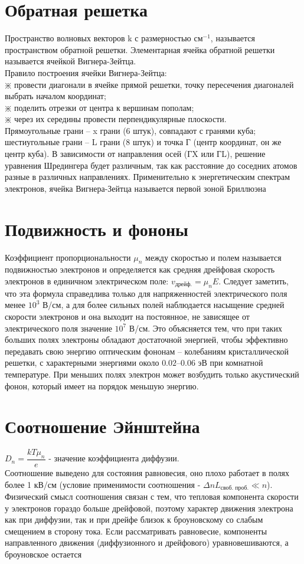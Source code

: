 \begin{multicols*}{2}
		\section{Обратная решетка}
		Пространство волновых векторов k с размерностью $\text{см}^{-1}$, называется пространством обратной решетки. Элементарная ячейка обратной решетки называется ячейкой Вигнера-Зейтца.\\
		Правило построения ячейки Вигнера-Зейтца:\\
		$\divideontimes$ провести диагонали в ячейке прямой решетки, точку пересечения диагоналей выбрать началом координат;\\
		$\divideontimes$ поделить отрезки от центра к вершинам пополам;\\
		$\divideontimes$ через их середины провести перпендикулярные плоскости.\\
		Прямоугольные грани – x грани (6 штук), совпадают с гранями куба; шестиугольные грани – L грани (8 штук) и точка Г (центр координат, он же центр куба). В зависимости от направления осей (ГX или ГL), решение уравнения Шредингера будет различным, так как расстояние до соседних атомов разные в различных направлениях. Применительно к энергетическим спектрам электронов, ячейка Вигнера-Зейтца называется первой зоной Бриллюэна

		\section{Подвижность и фононы}
		Коэффициент пропорциональности $\mu_n$ между скоростью и полем называется подвижностью электронов и определяется как средняя дрейфовая скорость электронов в единичном электрическом поле: $v_\text{дрейф.} = \mu_n E$. Следует заметить, что эта формула справедлива только для напряженностей электрического поля менее $10^3$ В/см, а для более сильных полей наблюдается насыщение средней скорости электронов и она выходит на постоянное, не зависящее от электрического поля значение $10^7$ В/см. Это объясняется тем, что при таких больших полях электроны обладают достаточной энергией, чтобы эффективно передавать свою энергию оптическим фононам – колебаниям кристаллической решетки, с характерными энергиями около $0.02–0.06$ эВ при комнатной температуре. При меньших полях электрон может возбудить только акустический фонон, который имеет на порядок меньшую энергию.

		\section{Соотношение Эйнштейна}
		$D_n = \dfrac{kT\mu_n}{e}$ - значение коэффициента диффузии. \\
		Соотношение выведено для состояния равновесия, оно плохо работает в полях более 1 кВ/см (условие применимости соотношения - $\Delta n L_\text{своб. проб.}\ll n$). Физический смысл соотношения связан с тем, что тепловая компонента скорости у электронов гораздо больше дрейфовой, поэтому характер движения электрона как при диффузии, так и при дрейфе близок к броуновскому со слабым смещением в сторону тока. Если рассматривать равновесие, компоненты направленного движения (диффузионного и дрейфового) уравновешиваются, а броуновское остается


\end{multicols*}
